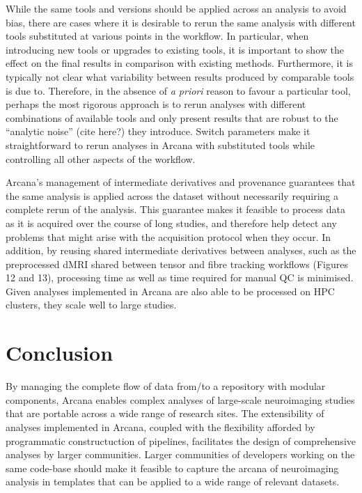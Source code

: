 While the same tools and versions should be applied across an analysis
to avoid bias, there are cases where it is desirable to rerun the same
analysis with different tools substituted at various points in the
workflow. In particular, when introducing new tools or upgrades to
existing tools, it is important to show the effect on the final results
in comparison with existing methods. Furthermore, it is typically not
clear what variability between results produced by comparable tools is
due to. Therefore, in the absence of \emph{a priori} reason to favour a
particular tool, perhaps the most rigorous approach is to rerun analyses
with different combinations of available tools and only present results
that are robust to the ``analytic noise'' (cite here?) they introduce.
Switch parameters make it straightforward to rerun analyses in Arcana
with substituted tools while controlling all other aspects of the
workflow.

Arcana's management of intermediate derivatives and provenance
guarantees that the same analysis is applied across the dataset without
necessarily requiring a complete rerun of the analysis. This guarantee
makes it feasible to process data as it is acquired over the course of
long studies, and therefore help detect any problems that might arise
with the acquisition protocol when they occur. In addition, by reusing
shared intermediate derivatives between analyses, such as the
preprocessed dMRI shared between tensor and fibre tracking workflows
(Figures 12 and 13), processing time as well as time required for manual
QC is minimised. Given analyses implemented in Arcana are also able to
be processed on HPC clusters, they scale well to large studies.

\section{Conclusion}
\label{conclusion}

By managing the complete flow of data from/to a repository with modular
components, Arcana enables complex analyses of large-scale neuroimaging
studies that are portable across a wide range of research sites. The
extensibility of analyses implemented in Arcana, coupled with the
flexibility afforded by programmatic constructuction of pipelines,
facilitates the design of comprehensive analyses by larger communities.
Larger communities of developers working on the same code-base should
make it feasible to capture the arcana of neuroimaging analysis in
templates that can be applied to a wide range of relevant datasets.


